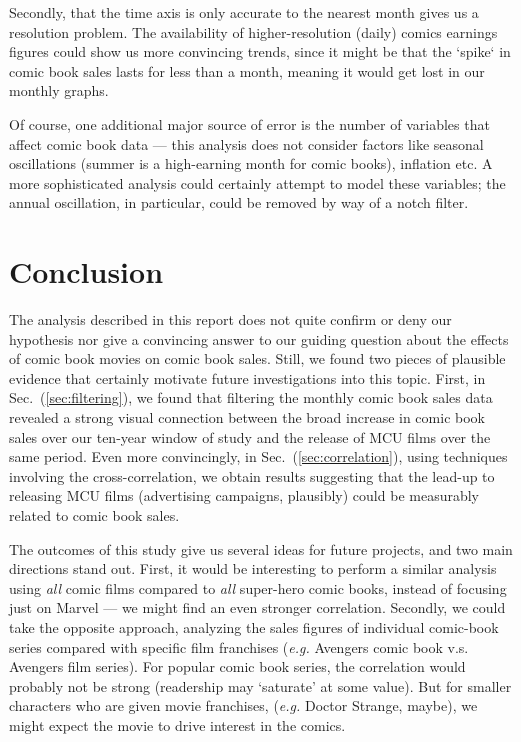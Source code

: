 \documentclass[12pt]{article}
\begin{document}
Secondly, that the time axis is only accurate to the nearest month gives us a resolution problem.  The availability of higher-resolution (daily) comics earnings figures could show us more convincing trends, since it might be that the `spike` in comic book sales lasts for less than a month, meaning it would get lost in our monthly graphs.

Of course, one additional major source of error is the number of variables that affect comic book data --- this analysis does not consider factors like seasonal oscillations (summer is a high-earning month for comic books), inflation etc.  A more sophisticated analysis could certainly attempt to model these variables; the annual oscillation, in particular, could be removed by way of a notch filter.

\section{Conclusion}
The analysis described in this report does not quite confirm or deny our hypothesis nor give a convincing answer to our guiding question about the effects of comic book movies on comic book sales.  Still, we found two pieces of plausible evidence that certainly motivate future investigations into this topic.  First, in Sec.~(\ref{sec:filtering}), we found that filtering the monthly comic book sales data revealed a strong visual connection between the broad increase in comic book sales over our ten-year window of study and the release of MCU films over the same period.  Even more convincingly, in Sec.~(\ref{sec:correlation}), using techniques involving the cross-correlation, we obtain results suggesting that the lead-up to releasing MCU films (advertising campaigns, plausibly) could be measurably related to comic book sales.

The outcomes of this study give us several ideas for future projects, and two main directions stand out.  First, it would be interesting to perform a similar analysis using \textit{all} comic films compared to \textit{all} super-hero comic books, instead of focusing just on Marvel --- we might find an even stronger correlation.  Secondly, we could take the opposite approach, analyzing the sales figures of individual comic-book series compared with specific film franchises (\textit{e.g.} Avengers comic book v.s. Avengers film series).  For popular comic book series, the correlation would probably not be strong (readership may `saturate' at some value). But for smaller characters who are given movie franchises, (\textit{e.g.} Doctor Strange, maybe), we might expect the movie to drive interest in the comics.
\end{document}
